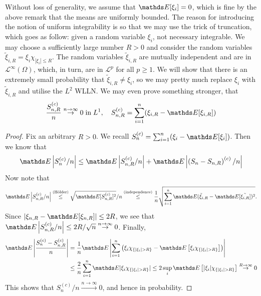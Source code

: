 \begin{unexaminable}
\begin{hint}
Without loss of generality, we assume that $\E[\xi_i] = 0$, which is fine by the above remark that the means are uniformly bounded. The reason for introducing the notion of uniform integrability is so that we may use the trick of truncation, which goes as follow: given a random variable $\xi_i$, not necessary integrable. We may choose a sufficiently large number $R>0$ and consider the random variables $\tilde{\xi}_{i,R} = \xi_i \chi_{|\xi_i| \leq R}$. The random variables $\tilde{\xi}_{i,R}$ are mutually independent and are in $\mathcal{L}^\infty(\Omega)$, which, in turn, are in $\mathcal{L}^p$ for all $p \geq 1$. We will show that there is an extremely small probability that $\tilde{\xi}_{i,R} \neq \xi_{i}$, so we may pretty much replace $\xi_{i}$ with $\tilde{\xi}_{i,R}$ and utilise the $L^2$ WLLN. We may even prove something stronger, that 
\begin{equation*}
\frac{S_{n,R}^{(c)}}{n} \overset{n\to\infty}\to 0 \; \text{in} \; L^1, \quad S_{n,R}^{(c)} = \sum_{i=1}^n (\xi_{i,R} - \E[\xi_{i,R}])
\end{equation*}
\end{hint}

\begin{proof}
Fix an arbitrary $R>0$. We recall $S_n^{(c)} = \sum_{i=1}^n (\xi_i - \E[\xi_i])$. Then we know that 
\begin{equation*}
\E\abs{S_n^{(c)}/n} \leq \E\abs{S_{n,R}^{(c)}/n} + \E\abs{\bracket{S_n - S_{n,R}}^{(c)}/n}
\end{equation*}
Now note that 
\begin{equation*}
\E\abs{S_{n,R}^{(c)}/n} \overset{\text{(H\"older)}}\leq \sqrt{\E[S_{n,R}^{(c)}]^2}/n \overset{\text{(independence)}}\leq \frac{1}{n} \sqrt{\sum_{i=1}^n \E(\tilde{\xi}_{i,R} - \E[\tilde{\xi_{i,R}}])^2}.  
\end{equation*}
Since $|\xi_{n,R}-\E[\xi_{n,R}]| \leq 2R$, we see that $\E\abs{S_{n,R}^{(c)}/n} \leq 2R/\sqrt{n} \overset{n\to\infty}\to 0$. Finally, 
\begin{align*}
\E\abs{\frac{S_n^{(c)} - S_{n,R}^{(c)}}{n}} &= \frac{1}{n}\E\abs{\sum_{i=1}^n \bracket{\xi_i \chi_{\set{|\xi_i|>R}} - \E\sqbracket{\xi_i \chi_{\set{|\xi_i|>R}}}}} \\
&\leq \frac{2}{n} \sum_{i=1}^n \E|\xi_i \chi_{\set{|\xi_i|>R}}| 
\leq 2 \sup_i \E\sqbracket{|\xi_i| \chi_{\set{|\xi_i|>R}}} \overset{R\to\infty}\to 0
\end{align*}
This shows that $S_n^{(c)}/n \overset{n\to\infty}\to 0$, and hence in probability.
\end{proof}


\end{unexaminable}
